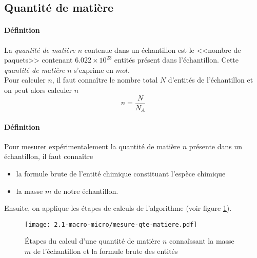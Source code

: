 \subsection{Quantité de matière}
\paragraph{Définition} La \textit{quantité de matière $n$} contenue dans un échantillon est le <<nombre de paquets>> contenant $6.022\times 10^{23}$ entités présent dans l'échantillon. Cette \textit{quantité de matière $n$} s'exprime en $mol$.\\
Pour calculer $n$, il faut connaître le nombre total $N$ d'entités de l'échantillon et on peut alors calculer $n$
$$n = \frac{N}{N_A}$$

\paragraph{Définition} Pour mesurer expérimentalement la quantité de matière $n$ présente dans un échantillon, il faut connaître
\begin{itemize}
 \item la formule brute de l'entité chimique constituant l'espèce chimique
 \item la masse $m$ de notre échantillon.
\end{itemize}
Ensuite, on applique les étapes de calculs de l'algorithme (voir figure \ref{fig:mesure-qte-matiere}).
\begin{figure}[!h]
    \begin{center}
	\texttt{[image: 2.1-macro-micro/mesure-qte-matiere.pdf]}
    \end{center}
    \caption{Étapes du calcul d'une quantité de matière $n$ connaîssant la masse $m$ de l'échantillon et la formule brute des entités}
    \label{fig:mesure-qte-matiere}
\end{figure}

